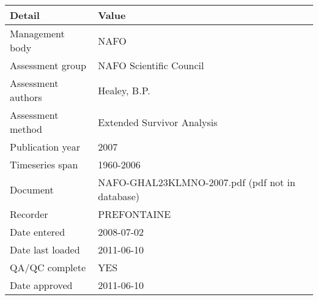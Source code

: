 \begin{table}[htb]
\centering
\begin{tabular}{ll}
\toprule
Detail & Value \\
\midrule
Management body    & NAFO                                            \\
Assessment group   & NAFO Scientific Council                         \\
Assessment authors & Healey, B.P.                                    \\
Assessment method  & Extended Survivor Analysis                      \\
Publication year   & 2007                                            \\
Timeseries span    & 1960-2006                                       \\
Document           & NAFO-GHAL23KLMNO-2007.pdf (pdf not in database) \\
Recorder           & PREFONTAINE                                     \\
Date entered       & 2008-07-02                                      \\
Date last loaded   & 2011-06-10                                      \\
QA/QC complete     & YES                                             \\
Date approved      & 2011-06-10                                      \\
\bottomrule
\end{tabular}
\label{tab:assessdet}
\end{table}

